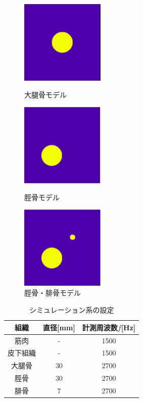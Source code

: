 \begin{figure}[H]
 \begin{minipage}{0.325\hsize}
  \begin{center}
   \includegraphics[width=40mm]{fig/daitai.pdf}
  \end{center}
  \caption{大腿骨モデル}
 \end{minipage}
 \begin{minipage}{0.325\hsize}
 \begin{center}
  \includegraphics[width=40mm]{fig/keikotsu.pdf}
 \end{center}
  \caption{脛骨モデル}
 \end{minipage}
 \begin{minipage}{0.325\hsize}
 \begin{center}
  \includegraphics[width=40mm]{fig/hikotsu.pdf}
 \end{center}
  \caption{脛骨・腓骨モデル}
 \end{minipage}
\end{figure}
\begin{table}[H]
\centering
\caption{シミュレーション系の設定}
\label{simulation_settei}
\begin{tabular}{|c|c|c|}
\hline
組織 & 直径[mm] & 計測周波数$f$[Hz]  \\ \hline
筋肉 & - &      1500 \\ \hline
皮下組織   & - &      1500\\ \hline
大腿骨  & 30 &     2700 \\ \hline
脛骨 & 30 &     2700 \\ \hline
腓骨  & 7 &     2700  \\ \hline
\end{tabular}
\end{table}
